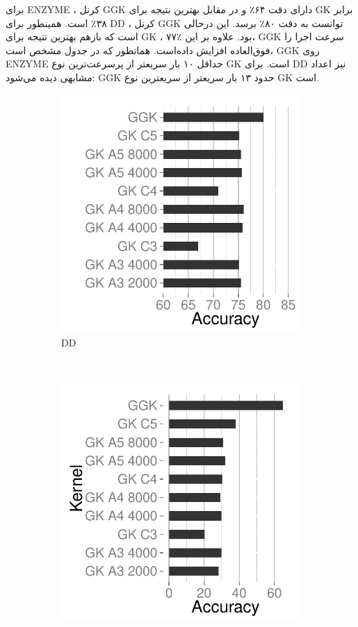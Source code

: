 برای ENZYME ، کرنل GGK دارای دقت ۶۴٪ و در مقابل بهترین نتیجه برای GK برابر ۳۸٪ است. همینطور برای DD ، کرنل GGK توانست به دقت ۸۰٪ برسد. این درحالی است که بازهم بهترین نتیجه برای GK ، ۷۷٪ بود. علاوه بر این، GGK سرعت اجرا را فوق‌العاده افزایش داده‌است. همانطور که در جدول  مشخص است، GGK روی ENZYME حداقل ۱۰ بار سریعتر از پرسرعت‌ترین نوع GK است. برای DD نیز اعداد مشابهی دیده می‌شود: GGK حدود ۱۳ بار سریعتر از سریعترین نوع GK است.
\begin{figure}[ht]
\centering
    \begin{subfigure}[t]{0.4\textwidth}
        \includegraphics[width=\textwidth]{./dd-ggk-gk.pdf}
        \caption{DD}
    \end{subfigure}%
~
    \begin{subfigure}[t]{0.4\textwidth}
        \includegraphics[width=\textwidth]{./enzymes-ggk-gk.pdf}

\end{subfigure}
\end{figure}
